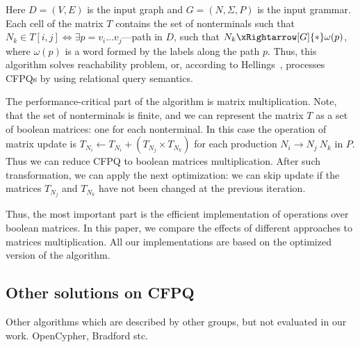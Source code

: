 Here $D = (V, E)$ is the input graph and $G = (N,\Sigma,P)$ is the input grammar.
Each cell of the matrix $T$ contains the set of nonterminals such that $N_k \in T[i,j] \iff \exists p = v_i \ldots v_j $---path in $D$, such that $N_k \xRightarrow[G]{*} \omega(p) $, where $\omega(p)$ is a word formed by the labels along the path $p$.
Thus, this algorithm solves reachability problem, or, according to Hellings~\cite{hellingsRelational}, processes CFPQs by using relational query semantics.

The performance-critical part of the algorithm is matrix multiplication.
Note, that the set of nonterminals is finite, and we can represent the matrix $T$ as a set of boolean matrices: one for each nonterminal.
In this case the operation of matrix update is $T_{N_i} \leftarrow T_{N_i} + (T_{N_j} \times T_{N_k})$ for each production $N_i \rightarrow N_j \ N_k$ in $P$.
Thus we can reduce CFPQ to boolean matrices multiplication.
After such transformation, we can apply the next optimization: we can skip update if the matrices $T_{N_j}$ and $T_{N_k}$ have not been changed at the previous iteration.

Thus, the most important part is the efficient implementation of operations over boolean matrices.
In this paper, we compare the effects of different approaches to matrices multiplication.
All our implementations are based on the optimized version of the algorithm.


\subsection{Other solutions on CFPQ}

Other algorithms which are described by other groups, but not evaluated in our work.
OpenCypher, Bradford stc. 